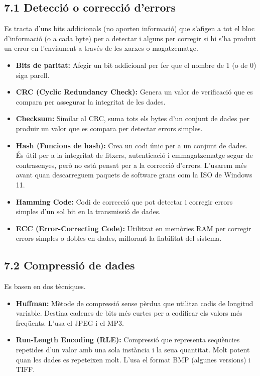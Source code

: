 \documentclass[
  12 pt,
  a4paper,
]{article}
\begin{document}
\subsection{7.1 Detecció o correcció
d'errors}\label{detecciuxf3-o-correcciuxf3-derrors}

Es tracta d'uns bits addicionals (no aporten informació) que s'afigen a
tot el bloc d'informació (o a cada byte) per a detectar i alguns per
corregir si hi s'ha produït un error en l'enviament a través de les
xarxes o magatzematge.

\begin{itemize}
\item
  \textbf{Bits de paritat:} Afegir un bit addicional per fer que el
  nombre de 1 (o de 0) siga parell.
\item
  \textbf{CRC (Cyclic Redundancy Check):} Genera un valor de verificació
  que es compara per assegurar la integritat de les dades.
\item
  \textbf{Checksum:} Similar al CRC, suma tots els bytes d'un conjunt de
  dades per produir un valor que es compara per detectar errors simples.
\item
  \textbf{Hash (Funcions de hash):} Crea un codi únic per a un conjunt
  de dades. És útil per a la integritat de fitxers, autenticació i
  emmagatzematge segur de contrasenyes, però no està pensat per a la
  correcció d'errors. L'usarem més avant quan descarreguem paquets de
  software grans com la ISO de Windows 11.
\item
  \textbf{Hamming Code:} Codi de correcció que pot detectar i corregir
  errors simples d'un sol bit en la transmissió de dades.
\item
  \textbf{ECC (Error-Correcting Code):} Utilitzat en memòries RAM per
  corregir errors simples o dobles en dades, millorant la fiabilitat del
  sistema.
\end{itemize}

\subsection{7.2 Compressió de dades}\label{compressiuxf3-de-dades}

Es basen en dos tècniques.

\begin{itemize}
\item
  \textbf{Huffman:} Mètode de compressió sense pèrdua que utilitza codis
  de longitud variable. Destina cadenes de bits més curtes per a
  codificar els valors més freqüents. L'usa el JPEG i el MP3.
\item
  \textbf{Run-Length Encoding (RLE):} Compressió que representa
  seqüències repetides d'un valor amb una sola instància i la seua
  quantitat. Molt potent quan les dades es repeteixen molt. L'usa el
  format BMP (algunes versions) i TIFF.
\end{itemize}
\end{document}
